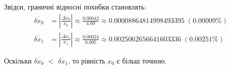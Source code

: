 Звідси, граничні відносні похибки становлять:
\begin{align}
    \overline{\delta x_0} & =
    |\frac{\hyperref[eq:x0_absolute_rounding_error]{\overline{\Delta x_0}}}{\hyperref[eq:x0_original]{x_0}}|
    \approx \frac{0.00042}{4.69}
    \approx 0.00008864814998493395 \; (0.00009\%)
    \label{eq:x0_relative_rounding_error} \\
    \overline{\delta x_1} & =
    |\frac{\hyperref[eq:x1_absolute_rounding_error]{\overline{\Delta x_1}}}{\hyperref[eq:x1_original]{x_1}}|
    \approx \frac{0.00024}{0.095}
    \approx 0.0025062656641603336 \; (0.00251\%)
    \label{eq:x1_relative_rounding_error}
\end{align}

Оскільки
\hyperref[eq:x0_relative_rounding_error]{$\overline{\delta x_0}$} $<$
\hyperref[eq:x1_relative_rounding_error]{$\overline{\delta x_1}$}, то рівність
\hyperref[eq:x0_original]{$x_0$} є більш точною.
